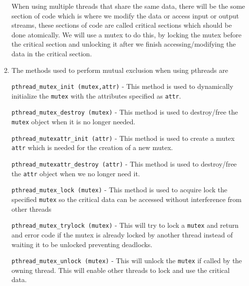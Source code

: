 \documentclass[11pt]{article}
\begin{document}
\begin{enumerate}
When using multiple threads that share the same data, there will
be the some section of code which is where we modify the data or
access input or output streams, these sections of code are called
critical sections which should be done atomically. We will use a
mutex to do this, by locking the mutex before the critical section
and unlocking it after we finish accessing/modifying the data in
the critical section.

\item The methods used to perform mutual exclusion when using pthreads are

\texttt{pthread\_mutex\_init (mutex,attr)} - This method is used to
dynamically initialize the \texttt{mutex} with the attributes specified as
\texttt{attr}.

\texttt{pthread\_mutex\_destroy (mutex)} - This method is used to
destroy/free the \texttt{mutex} object when it is no longer needed.

\texttt{pthread\_mutexattr\_init (attr)} - This method is used to create
a mutex \texttt{attr} which is needed for the creation of a new mutex.

\texttt{pthread\_mutexattr\_destroy (attr)} - This method is used to
destroy/free the \texttt{attr} object when we no longer need it.

\texttt{pthread\_mutex\_lock (mutex)} - This method is used to acquire
lock the specified \texttt{mutex} so the critical data can be accessed
without interference from other threads

\texttt{pthread\_mutex\_trylock (mutex)} - This will try to lock a \texttt{mutex}
and return and error code if the mutex is already locked by
another thread instead of waiting it to be unlocked preventing
deadlocks.

\texttt{pthread\_mutex\_unlock (mutex)} - This will unlock the \texttt{mutex} if
called by the owning thread. This will enable other threads to
lock and use the critical data.
\end{enumerate}
\end{document}
